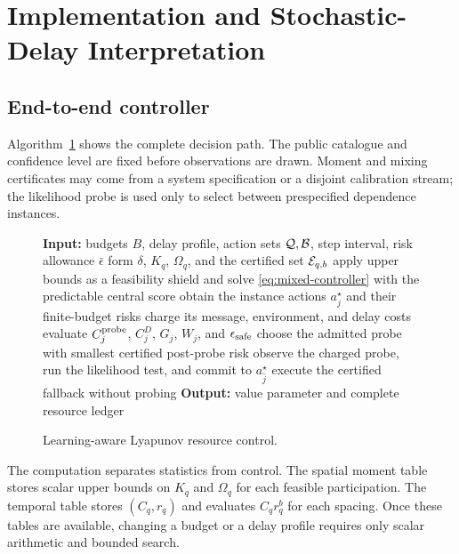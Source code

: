 \documentclass[journal]{IEEEtran}
\begin{document}
\section{Implementation and Stochastic-Delay Interpretation}
\subsection{End-to-end controller}
Algorithm~\ref{alg:controller} shows the complete decision path.
The public catalogue and confidence level are fixed before observations are drawn.
Moment and mixing certificates may come from a system specification or a disjoint calibration stream; the likelihood probe is used only to select between prespecified dependence instances.

\begin{figure}[t]
\centering
\begin{minipage}{0.97\columnwidth}
\begin{algorithmic}[1]
\STATE \textbf{Input:} budgets $B$, delay profile, action sets ${\cal Q},{\cal B}$, step interval, risk allowance $\bar\epsilon$
\STATE form $\delta$, $K_q$, $\Omega_q$, and the certified set ${\cal E}_{q,b}$
\STATE apply upper bounds as a feasibility shield and solve \eqref{eq:mixed-controller} with the predictable central score
\ENDFOR
\STATE obtain the instance actions $a_j^\star$ and their finite-budget risks
\STATE charge its message, environment, and delay costs
\STATE evaluate $C_j^{\rm probe}$, $C_j^D$, $G_j$, $W_j$, and $\epsilon_{\rm safe}$
\ENDFOR
{}
\STATE choose the admitted probe with smallest certified post-probe risk
\STATE observe the charged probe, run the likelihood test, and commit to $a_{\widehat j}^\star$
\ELSE
\STATE execute the certified fallback without probing
\ENDIF
\STATE \textbf{Output:} value parameter and complete resource ledger
\end{algorithmic}
\end{minipage}
\caption{Learning-aware Lyapunov resource control.}
\label{alg:controller}
\end{figure}

The computation separates statistics from control.
The spatial moment table stores scalar upper bounds on $K_q$ and $\Omega_q$ for each feasible participation.
The temporal table stores $(C_q,r_q)$ and evaluates $C_qr_q^b$ for each spacing.
Once these tables are available, changing a budget or a delay profile requires only scalar arithmetic and bounded search.
\end{document}
